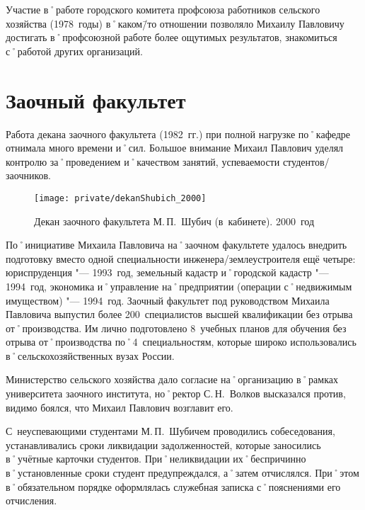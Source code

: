 Участие в˚работе городского комитета профсоюза работников сельского хозяйства (1978~годы) в˚каком\=/то отношении позволяло Михаилу Павловичу достигать в˚профсоюзной работе более ощутимых результатов, знакомиться с˚работой других организаций.






\section*{Заочный факультет}
\label{sec:correspondenceFaculty}

Работа декана заочного факультета (1982~гг.) при полной нагрузке по˚кафедре отнимала много времени и˚сил. Большое внимание Михаил Павлович уделял контролю за˚проведением и˚качеством занятий, успеваемости студентов\-/заочников.

\begin{figure}[h]
\texttt{[image: private/dekanShubich\_2000]}
\caption[Декан заочного факультета М.\,П.~Шубич (в~кабинете). 2000~год]{Декан заочного факультета М.\,П.~Шубич (в~кабинете). 2000~год\footnotemark}
\label{fig:dekanShubich_2000}
\end{figure}

По˚инициативе Михаила Павловича на˚заочном факультете удалось внедрить подготовку вместо одной специальности инженера\-/землеустроителя ещё четыре: юриспруденция "--- 1993~год, земельный кадастр и˚городской кадастр "--- 1994~год, экономика и˚управление на˚предприятии (операции с˚недвижимым имуществом) "--- 1994~год. Заочный факультет под руководством Михаила Павловича выпустил более 200~специалистов высшей квалификации без отрыва от˚производства. Им лично подготовлено 8~учебных планов для обучения без отрыва от˚производства по˚4~специальностям, которые широко использовались в˚сельскохозяйственных вузах России. 

Министерство сельского хозяйства дало согласие на˚организацию в˚рамках университета заочного института, но˚ректор С.\,Н.~Волков высказался против, видимо боялся, что Михаил Павлович возглавит его.

С~неуспевающими студентами М.\,П.~Шубичем проводились собеседования, устанавливались сроки ликвидации задолженностей, которые заносились в˚учётные карточки студентов. При˚неликвидации их˚беспричинно в˚установленные сроки студент предупреждался, а˚затем отчислялся. При˚этом в˚обязательном порядке оформлялась служебная записка с˚пояснениями его отчисления.

